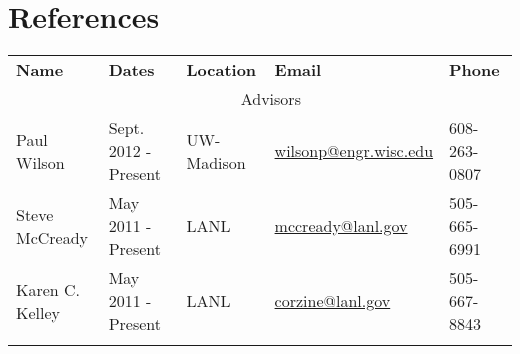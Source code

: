 %
%
%

\section{References}
\begin{longtable}{lllll} \vspace{4mm}
   \textbf{Name}    & \textbf{Dates}    & \textbf{Location}	 	& \textbf{Email} & \textbf{Phone} \\  \vspace{2mm}

              & \multicolumn{3}{c}{\Large{Advisors}} &  \\  \vspace{2mm}
{Paul Wilson}\label{paul_wilson} & {Sept. 2012 - Present}  & {UW-Madison}& \href{mailto:wilsonp@engr.wisc.edu}{wilsonp@engr.wisc.edu} &  608-263-0807 \\ \vspace{2mm}

{Steve McCready} \label{steve_mccready}& {May 2011 - Present} &{LANL} & \href{mailto:mccready@lanl.gov}{mccready@lanl.gov} & 505-665-6991\\ \vspace{2mm}

{Karen C. Kelley} \label{karen_kelley} &   {May 2011 - Present} &{LANL} & \href{mailto:corzine@lanl.gov}{corzine@lanl.gov} & 505-667-8843\\ \vspace{2mm}



				       

  

\end{longtable}
